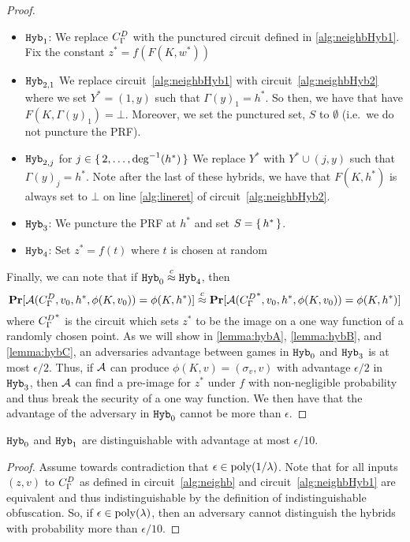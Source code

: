 \begin{lemma}
\begin{proof}
\begin{itemize}
			\item $\texttt{Hyb}_1$: We replace ${C_\Gamma^D}$ with the punctured circuit defined in \cref{alg:neighbHyb1}.
			Fix the constant $z^* = f(F(K, w^*))$
			\item $\texttt{Hyb}_{2, 1}$
			We replace circuit~\ref{alg:neighbHyb1} with circuit~\ref{alg:neighbHyb2} where we 
			set $Y^* = (1, y)$ such that $\Gamma(y)_1 = h^*$. So then, we have that
			have $F(K, \Gamma(y)_1) = \bot$. Moreover, we set the punctured set, $S$ to $\emptyset$ (i.e.\ we do not puncture the PRF).
			\item $\texttt{Hyb}_{2, j}$ for $j \in \set{2, \dots, \deg^{-1}(h^*)}$
			We replace $Y^*$ with $Y^* \cup (j, y)$ such that $\Gamma(y)_j = h^*$.
			Note after the last of these hybrids, we have that $F(K, h^*)$ is always set to $\bot$ on line \ref{alg:lineret} of circuit~\ref{alg:neighbHyb2}.
			\item $\texttt{Hyb}_3$: We puncture the PRF at $h^*$ and set $S = \set{h^*}$.
			\item $\texttt{Hyb}_4$: Set $z^* = f(t)$ where $t$ is chosen at random %
		\end{itemize}
		Finally, we can note that if $\texttt{Hyb}_0 \overset{c}{\approx} \texttt{Hyb}_4$, then
		\begin{equation*}
			\operatorname*{\mathbf{Pr}}[\mathcal{A}({C_\Gamma^D}, v_0, h^*, \phi(K, v_0)) = \phi(K, h^*)] 
			\overset{c}{\approx}
			\operatorname*{\mathbf{Pr}}[\mathcal{A}({C_\Gamma^D}^*, v_0, h^*, \phi(K, v_0)) = \phi(K, h^*)]
		\end{equation*}
		where ${C_\Gamma^D}^*$ is the circuit which sets $z^*$ to be the image on a one way function of a randomly chosen point.
		As we will show in \cref{lemma:hybA}, \cref{lemma:hybB}, and \cref{lemma:hybC},
		an adversaries advantage between games in $\texttt{Hyb}_0$ and $\texttt{Hyb}_3$ is at most $\epsilon / 2$.
		Thus, if $\mathcal{A}$ can produce $\phi(K, v) = (\sigma_v, v)$ with advantage $\epsilon / 2$
		in $\texttt{Hyb}_3$, then $\mathcal{A}$
		can find a pre-image for $z^*$ under $f$ with non-negligible probability and thus break the security of a one way function.
		We then have that the advantage of the adversary in $\texttt{Hyb}_0$ cannot be more than $\epsilon$.
	\end{proof}
\end{lemma}


\begin{lemma}
	\label{lemma:hybA}
	$\texttt{Hyb}_0$ and $\texttt{Hyb}_1$ are distinguishable with advantage at most $\epsilon / 10$.
	\begin{proof}
		Assume towards contradiction that $\epsilon \in \operatorname{poly}(1/\lambda)$.
		Note that for all inputs $(z, v)$ to ${C_\Gamma^D}$ as defined in circuit~\ref{alg:neighb} and circuit~\ref{alg:neighbHyb1}
		are equivalent and thus indistinguishable by the definition of indistinguishable obfuscation.
		So, if $\epsilon \in \operatorname{poly}(\lambda)$, then an adversary cannot distinguish the hybrids with probability more than $\epsilon / 10$.
	\end{proof}
\end{lemma}

